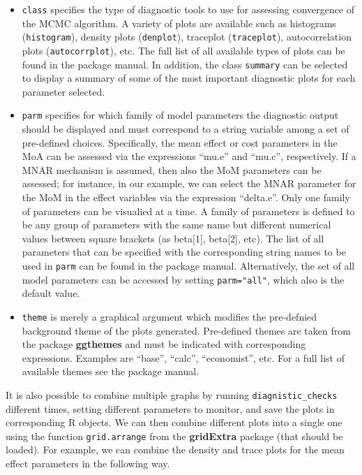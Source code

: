 \documentclass[]{article}
\begin{document}
\begin{itemize}
\item
  \texttt{class} specifies the type of diagnostic tools to use for
  assessing convergence of the MCMC algorithm. A variety of plots are
  available such as histograms (\texttt{histogram}), density plots
  (\texttt{denplot}), traceplot (\texttt{traceplot}), autocorrelation
  plots (\texttt{autocorrplot}), etc. The full list of all available
  types of plots can be found in the package manual. In addition, the
  class \texttt{summary} can be selected to display a summary of some of
  the most important diagnostic plots for each parameter selected.
\item
  \texttt{parm} specifies for which family of model parameters the
  diagnostic output should be displayed and must correspond to a string
  variable among a set of pre-defined choices. Specifically, the mean
  effect or cost parameters in the MoA can be assessed via the
  expressions ``mu.e'' and ``mu.c'', respectively. If a MNAR mechanism
  is assumed, then also the MoM parameters can be assessed; for
  instance, in our example, we can select the MNAR parameter for the MoM
  in the effect variables via the expression ``delta.e''. Only one
  family of parameters can be visualied at a time. A family of
  parameters is defined to be any group of parameters with the same name
  but different numerical values between square brackets (as
  beta{[}1{]}, beta{[}2{]}, etc). The list of all parameters that can be
  specified with the corresponding string names to be used in
  \texttt{parm} can be found in the package manual. Alternatively, the
  set of all model parameters can be accessed by setting
  \texttt{parm="all"}, which also is the default value.
\item
  \texttt{theme} is merely a graphical argument which modifies the
  pre-defnied background theme of the plots generated. Pre-defined
  themes are taken from the package \textbf{ggthemes} and must be
  indicated with corresponding expressions. Examples are ``base'',
  ``calc'', ``economist'', etc. For a full list of available themes see
  the package manual.
\end{itemize}

It is also possible to combine multiple graphs by running
\texttt{diagnistic\_checks} different times, setting different
parameters to monitor, and save the plots in corresponding R objects. We
can then combine different plots into a single one using the function
\texttt{grid.arrange} from the \textbf{gridExtra} package (that should
be loaded). For example, we can combine the density and trace plots for
the mean effect parameters in the following way.
\end{document}
